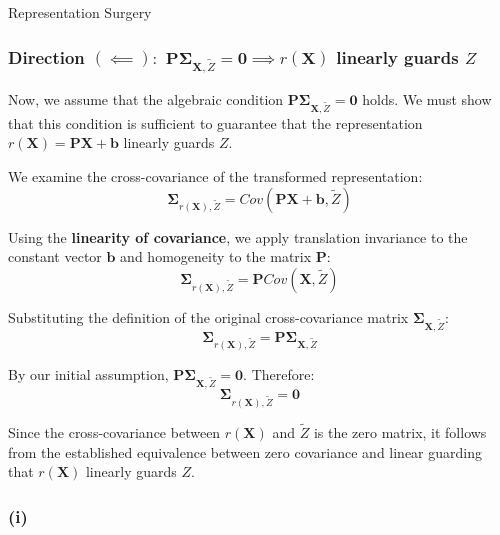 \begin{question}{Representation Surgery}
\begin{subquestion}
\subsubsection*{Direction $(\impliedby):$ $\mathbf{P} \boldsymbol{\Sigma}_{\mathbf{X}, \tilde{Z}} = \mathbf{0} \implies r(\mathbf{X})$ linearly guards $Z$}

Now, we assume that the algebraic condition $\mathbf{P} \boldsymbol{\Sigma}_{\mathbf{X}, \tilde{Z}} = \mathbf{0}$ holds. We must show that this condition is sufficient to guarantee that the representation $r(\mathbf{X}) = \mathbf{P}\mathbf{X} + \mathbf{b}$ linearly guards $Z$.

We examine the cross-covariance of the transformed representation:
$$\boldsymbol{\Sigma}_{r(\mathbf{X}), \tilde{Z}} = Cov(\mathbf{P}\mathbf{X} + \mathbf{b}, \tilde{Z})$$

Using the \textbf{linearity of covariance}, we apply translation invariance to the constant vector $\mathbf{b}$ and homogeneity to the matrix $\mathbf{P}$:
$$\boldsymbol{\Sigma}_{r(\mathbf{X}), \tilde{Z}} = \mathbf{P} Cov(\mathbf{X}, \tilde{Z})$$

Substituting the definition of the original cross-covariance matrix $\boldsymbol{\Sigma}_{\mathbf{X}, \tilde{Z}}$:
$$\boldsymbol{\Sigma}_{r(\mathbf{X}), \tilde{Z}} = \mathbf{P} \boldsymbol{\Sigma}_{\mathbf{X}, \tilde{Z}}$$

By our initial assumption, $\mathbf{P} \boldsymbol{\Sigma}_{\mathbf{X}, \tilde{Z}} = \mathbf{0}$. Therefore:
$$\boldsymbol{\Sigma}_{r(\mathbf{X}), \tilde{Z}} = \mathbf{0}$$

Since the cross-covariance between $r(\mathbf{X})$ and $\tilde{Z}$ is the zero matrix, it follows from the established equivalence between zero covariance and linear guarding that $r(\mathbf{X})$ linearly guards $Z$.
\end{subquestion}

\begin{subquestion}

\subsubsection*{(i)}


\end{subquestion}
\end{question}
